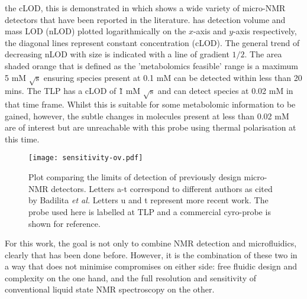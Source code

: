the cLOD, this is demonstrated in  which shows a wide variety of micro-NMR detectors that have been reported in the literature.
 has detection volume and mass LOD (nLOD) plotted logarithmically
on the $x$-axis and $y$-axis respectively, the diagonal lines represent constant concentration (cLOD).
The general trend of decreasing nLOD with size is indicated with a line of gradient $1/2$. The area shaded orange that
is defined as the 'metabolomics feasible' range is a maximum 5 mM $\sqrt{\text{s}}$
ensuring species present at 0.1 mM can be detected within less than 20 mins. The TLP has a cLOD of \~1 mM $\sqrt{\text{s}}$ and can detect
species at 0.02 mM in that time frame. Whilst this is suitable for some metabolomic information to be
gained, however, the subtle changes in molecules present at less than 0.02 mM are of interest but
are unreachable with this probe using thermal polarisation at this time.
\begin{figure}[h]
  \texttt{[image: sensitivity-ov.pdf]}
  \caption{Plot comparing the limits of detection of previously design micro-NMR detectors. Letters
  a-t correspond to different authors as cited by Badilita \textit{et al.} \citep{Badilita:2011td} Letters u \citep{Meier:2014ds}
  and t \citep{RN165} represent more recent work. The probe used here is labelled at TLP and a commercial cyro-probe is shown for reference.}
  \label{fig:cLOD}
\end{figure}

For this work, the goal is not only to combine NMR detection and microfluidics, clearly that has been done before. However,
it is the combination of these two in a way that does not minimise compromises on either side: free fluidic design and complexity
on the one hand, and the full resolution and sensitivity of conventional liquid state NMR spectroscopy on the other. 
